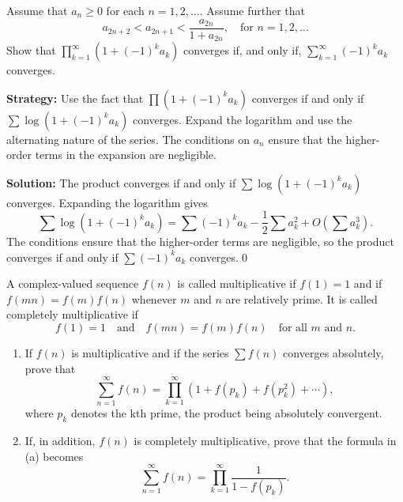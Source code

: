 \begin{problembox}
\begin{problemstatement}
Assume that \(a_n \geq 0\) for each \(n = 1, 2, \ldots\). Assume further that
\[a_{2n+2} < a_{2n+1} < \frac{a_{2n}}{1 + a_{2n}}, \quad \text{for } n = 1, 2, \ldots\]
Show that \(\prod_{k=1}^{\infty} (1 + (-1)^k a_k)\) converges if, and only if, \(\sum_{k=1}^{\infty} (-1)^k a_k\) converges.
\end{problemstatement}
\end{problembox}

\noindent\textbf{Strategy:} Use the fact that \(\prod(1+(-1)^k a_k)\) converges if and only if \(\sum \log(1+(-1)^k a_k)\) converges. Expand the logarithm and use the alternating nature of the series. The conditions on \(a_n\) ensure that the higher-order terms in the expansion are negligible.

\bigskip\noindent\textbf{Solution:}
The product converges if and only if \(\sum \log(1+(-1)^k a_k)\) converges. Expanding the logarithm gives
\[\sum \log(1+(-1)^k a_k) = \sum (-1)^k a_k - \frac{1}{2}\sum a_k^2 + O(\sum a_k^3).\]
The conditions ensure that the higher-order terms are negligible, so the product converges if and only if \(\sum (-1)^k a_k\) converges.\qed



\begin{problembox}
\begin{problemstatement}
A complex-valued sequence \(f(n)\) is called multiplicative if \(f(1) = 1\) and if \(f(mn) = f(m)f(n)\) whenever \(m\) and \(n\) are relatively prime. It is called completely multiplicative if
\[f(1) = 1 \quad \text{and} \quad f(mn) = f(m)f(n) \quad \text{for all } m \text{ and } n.\]
\begin{enumerate}[label=\alph*)]
\item If \(f(n)\) is multiplicative and if the series \(\sum f(n)\) converges absolutely, prove that
\[\sum_{n=1}^{\infty} f(n) = \prod_{k=1}^{\infty} (1 + f(p_k) + f(p_k^2) + \cdots),\]
where \(p_k\) denotes the kth prime, the product being absolutely convergent.
\item If, in addition, \(f(n)\) is completely multiplicative, prove that the formula in (a) becomes
\[\sum_{n=1}^{\infty} f(n) = \prod_{k=1}^{\infty} \frac{1}{1 - f(p_k)}.\]
\end{enumerate}
\end{problemstatement}
\end{problembox}

